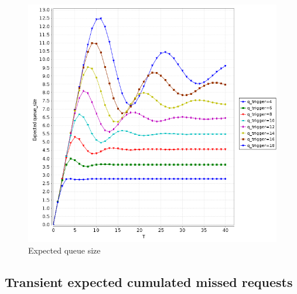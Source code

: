 \begin{figure}[htb]
  \centering
  \includegraphics[width=13cm]{quantitative-project/expected-queue-size-multi-q-triggers.png}
  \caption{Expected queue size}
  \label{fig:expected-queue-size}
\end{figure}

\subsection{Transient expected cumulated missed requests }

